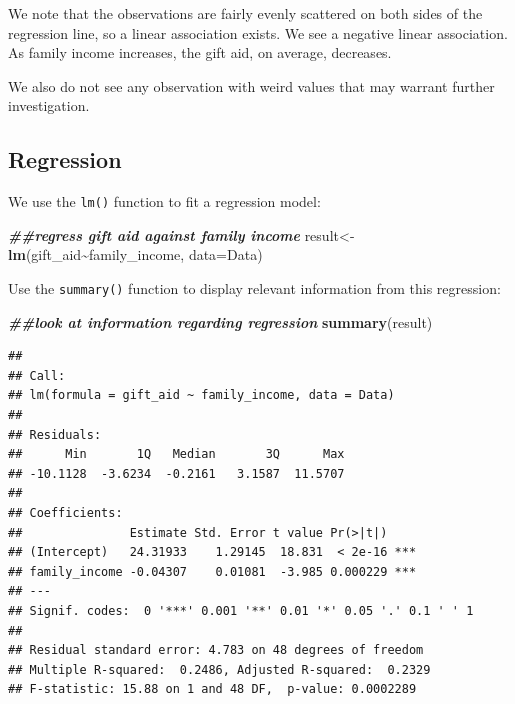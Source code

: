 \documentclass[
]{book}
\newenvironment{Shaded}{\begin{snugshade}}{\end{snugshade}}
\newcommand{\AttributeTok}[1]{\textcolor[rgb]{0.13,0.29,0.53}{#1}}
\newcommand{\DocumentationTok}[1]{\textcolor[rgb]{0.56,0.35,0.01}{\textbf{\textit{#1}}}}
\newcommand{\FunctionTok}[1]{\textcolor[rgb]{0.13,0.29,0.53}{\textbf{#1}}}
\newcommand{\NormalTok}[1]{#1}
\newcommand{\OtherTok}[1]{\textcolor[rgb]{0.56,0.35,0.01}{#1}}
\newcommand{\SpecialCharTok}[1]{\textcolor[rgb]{0.81,0.36,0.00}{\textbf{#1}}}
\begin{document}
We note that the observations are fairly evenly scattered on both sides of the regression line, so a linear association exists. We see a negative linear association. As family income increases, the gift aid, on average, decreases.

We also do not see any observation with weird values that may warrant further investigation.

\subsection*{Regression}\label{regression}

We use the \texttt{lm()} function to fit a regression model:

\begin{Shaded}
\begin{Highlighting}[]
\DocumentationTok{\#\#regress gift aid against family income}
\NormalTok{result}\OtherTok{\textless{}{-}}\FunctionTok{lm}\NormalTok{(gift\_aid}\SpecialCharTok{\textasciitilde{}}\NormalTok{family\_income, }\AttributeTok{data=}\NormalTok{Data)}
\end{Highlighting}
\end{Shaded}

Use the \texttt{summary()} function to display relevant information from this regression:

\begin{Shaded}
\begin{Highlighting}[]
\DocumentationTok{\#\#look at information regarding regression}
\FunctionTok{summary}\NormalTok{(result)}
\end{Highlighting}
\end{Shaded}

\begin{verbatim}
## 
## Call:
## lm(formula = gift_aid ~ family_income, data = Data)
## 
## Residuals:
##      Min       1Q   Median       3Q      Max 
## -10.1128  -3.6234  -0.2161   3.1587  11.5707 
## 
## Coefficients:
##               Estimate Std. Error t value Pr(>|t|)    
## (Intercept)   24.31933    1.29145  18.831  < 2e-16 ***
## family_income -0.04307    0.01081  -3.985 0.000229 ***
## ---
## Signif. codes:  0 '***' 0.001 '**' 0.01 '*' 0.05 '.' 0.1 ' ' 1
## 
## Residual standard error: 4.783 on 48 degrees of freedom
## Multiple R-squared:  0.2486, Adjusted R-squared:  0.2329 
## F-statistic: 15.88 on 1 and 48 DF,  p-value: 0.0002289
\end{verbatim}
\end{document}
